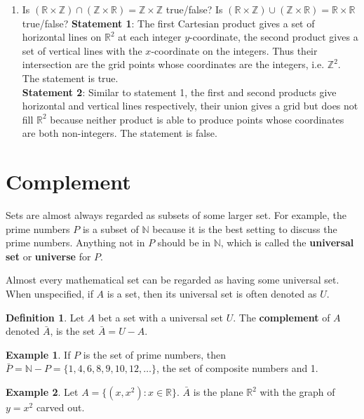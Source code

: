 \documentclass[10pt]{article}
\newcommand{\R}{\mathbb{R}}
\newcommand{\N}{\mathbb{N}}
\newcommand{\Z}{\mathbb{Z}}
\theoremstyle{definition}
\newtheorem{example}{Example}
\newtheorem{definition}{Definition}
\begin{document}
\begin{enumerate}
\begin{figure}
                \caption{Exercises 1.5.5 and 1.5.7}
            \end{figure}
        \item Is $(\R\times\Z)\cap(\Z\times\R)=\Z\times\Z$ true/false? Is $(\R\times\Z)\cup(\Z\times\R)=\R\times\R$ true/false?
            \textbf{Statement 1}: The first Cartesian product gives a set of horizontal lines on $\R^2$ at each integer $y$-coordinate, the second product gives a set of vertical lines with the $x$-coordinate on the integers. Thus their intersection are the grid points whose coordinates are the integers, i.e. $\Z^2$. The statement is true.\\
            \textbf{Statement 2}: Similar to statement 1, the first and second products give horizontal and vertical lines respectively, their union gives a grid but does not fill $\R^2$ because neither product is able to produce points whose coordinates are both non-integers. The statement is false.
    \end{enumerate}

    \section{Complement}
    Sets are almost always regarded as subsets of some larger set. For example, the prime numbers $P$ is a subset of $\N$ because it is the best setting to discuss the prime numbers. Anything not in $P$ should be in $\N$, which is called the \textbf{universal set} or \textbf{universe} for $P$.

    Almost every mathematical set can be regarded as having some universal set. When unspecified, if $A$ is a set, then its universal set is often denoted as $U$.

    \begin{definition}
        Let $A$ bet a set with a universal set $U$. The \textbf{complement} of $A$ denoted $\bar{A}$, is the set $\bar{A}=U-A$.
    \end{definition}

    \begin{example}
        If $P$ is the set of prime numbers, then $\bar P = \N - P = \{1,4,6,8,9,10,12, \dots\}$, the set of composite numbers and 1.
    \end{example}

    \begin{example}
        Let $A = \{(x,x^2):x\in\R\}$. $\bar A$ is the plane $\R^2$ with the graph of $y=x^2$ carved out.
    \end{example}
\end{document}
